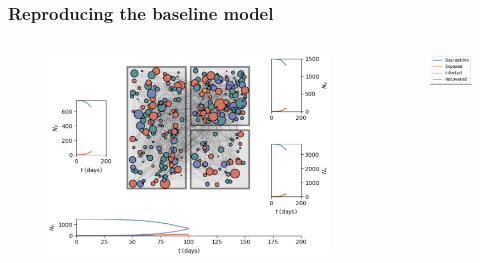 \documentclass[8pt]{beamer}
\begin{document}
\begin{frame}
\frametitle{Reproducing the baseline model}

\begin{columns}[h]

    \begin{column}{10cm}
        \begin{figure}[h]
           \centering
           \includegraphics[width=10cm]{figs/vis.png}
        \end{figure}
    \end{column}
    
    \begin{column}{2cm}
        \begin{figure}
            \centering
            \includegraphics[width=2cm]{figs/vis_labels.png}
        \end{figure}
    \end{column}

\end{columns}


\end{frame}

\end{document}
